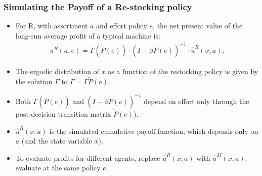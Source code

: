 \documentclass[aspectratio=169]{beamer}
\begin{document}

\begin{frame}[label=supplemental2]
\frametitle{Simulating the Payoff of a Re-stocking policy}
\vfill
\begin{itemize}
\item For R, with assortment $a$ and effort policy $e$, the net present value of the long-run average profit of a typical machine is: 
\begin{eqnarray}
\label{retail_payoffs}
\pi^R(a,e) = \Gamma(\tilde{P}(e)) \cdot(I - \beta \tilde{P}(e))^{-1} \cdot \hat{u}^R(x,a).
\end{eqnarray}
\item The ergodic distribution of $x$ as a function of the restocking policy is given by the solution $\Gamma$ to $\Gamma= \Gamma \tilde{P}(e). $ 
\item  Both $\Gamma(\tilde{P}(e))$ and $(I - \beta \tilde{P}(e))^{-1}$ depend on effort only through the post-decision transition matrix $\tilde{P}(e)$). 
\item $\hat{u}^R(x,a)$ is the simulated cumulative payoff function, which depends only on $a$ (and the state variable $x$). 
\item To evaluate profits for different agents, replace $\hat{u}^R(x,a)$ with $\hat{u}^M(x,a)$; evaluate at the same policy $e$.
\end{itemize}
\vfill
\hyperlink{main}{}
\end{frame}
\end{document}
